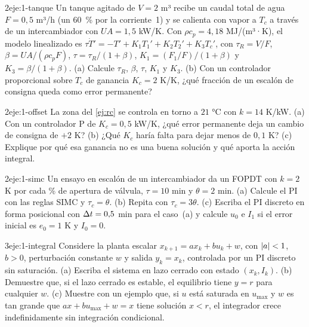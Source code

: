 \begin{ejercicio}{2}{eje:1-tanque}
Un tanque agitado de $V=2$ m³ recibe un caudal total de agua $F=0{,}5$ m³/h (un 60~\% por la corriente~1) y se calienta con vapor a $T_c$ a través de un intercambiador con $UA=1{,}5$ kW/K. Con $\rho c_p=4{,}18$ MJ/(m³·K), el modelo linealizado es $\tau\dot T'=-T'+K_1T_1'+K_2T_2'+K_3T_c'$, con $\tau_R=V/F$, $\beta=UA/(\rho c_pF)$, $\tau=\tau_R/(1+\beta)$, $K_1=(F_1/F)/(1+\beta)$ y $K_3=\beta/(1+\beta)$. (a) Calcule $\tau_R$, $\beta$, $\tau$, $K_1$ y $K_3$. (b) Con un controlador proporcional sobre $T_c$ de ganancia $K_c=2$ K/K, ¿qué fracción de un escalón de consigna queda como error permanente?
\end{ejercicio}

\begin{ejercicio}{2}{eje:1-offset}
La zona del \cref{ej:rc} se controla en torno a $21$ °C con $k=14$ K/kW. (a) Con un controlador P de $K_c=0{,}5$ kW/K, ¿qué error permanente deja un cambio de consigna de $+2$ K? (b) ¿Qué $K_c$ haría falta para dejar menos de $0{,}1$ K? (c) Explique por qué esa ganancia no es una buena solución y qué aporta la acción integral.
\end{ejercicio}

\begin{ejercicio}{2}{eje:1-simc}
Un ensayo en escalón de un intercambiador da un FOPDT con $k=2$ K por cada \% de apertura de válvula, $\tau=10$ min y $\theta=2$ min. (a) Calcule el PI con las reglas SIMC y $\tau_c=\theta$. (b) Repita con $\tau_c=3\theta$. (c) Escriba el PI discreto en forma posicional con $\Delta t=0{,}5$ min para el caso~(a) y calcule $u_0$ e $I_1$ si el error inicial es $e_0=1$ K y $I_0=0$.
\end{ejercicio}

\begin{ejercicio}{3}{eje:1-integral}
Considere la planta escalar $x_{k+1}=ax_k+bu_k+w$, con $\lvert a\rvert<1$, $b>0$, perturbación constante $w$ y salida $y_k=x_k$, controlada por un PI discreto sin saturación. (a) Escriba el sistema en lazo cerrado con estado $(x_k,I_k)$. (b) Demuestre que, si el lazo cerrado es estable, el equilibrio tiene $y=r$ para cualquier $w$. (c) Muestre con un ejemplo que, si $u$ está saturada en $u_{\max}$ y $w$ es tan grande que $ax+bu_{\max}+w=x$ tiene solución $x<r$, el integrador crece indefinidamente sin integración condicional.
\end{ejercicio}

